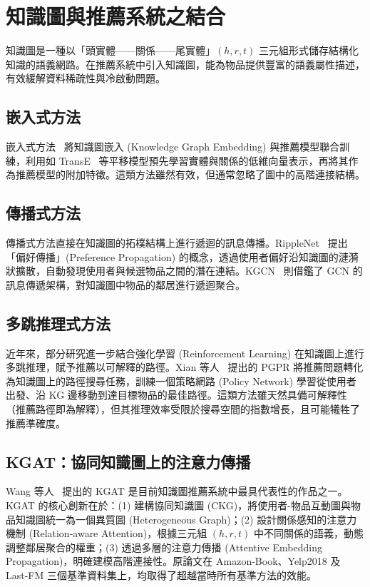 \section{知識圖與推薦系統之結合}

知識圖是一種以「頭實體——關係——尾實體」$(h, r, t)$ 三元組形式儲存結構化知識的語義網路。在推薦系統中引入知識圖，能為物品提供豐富的語義屬性描述，有效緩解資料稀疏性與冷啟動問題。

\subsection*{嵌入式方法}

嵌入式方法~\cite{wang2019cke} 將知識圖嵌入 (Knowledge Graph Embedding) 與推薦模型聯合訓練，利用如 TransE~\cite{bordes2013transe} 等平移模型預先學習實體與關係的低維向量表示，再將其作為推薦模型的附加特徵。這類方法雖然有效，但通常忽略了圖中的高階連接結構。

\subsection*{傳播式方法}

傳播式方法直接在知識圖的拓樸結構上進行遞迴的訊息傳播。RippleNet~\cite{wang2018ripplenet} 提出「偏好傳播」(Preference Propagation) 的概念，透過使用者偏好沿知識圖的漣漪狀擴散，自動發現使用者與候選物品之間的潛在連結。KGCN~\cite{wang2019kgcn} 則借鑑了 GCN 的訊息傳遞架構，對知識圖中物品的鄰居進行遞迴聚合。

\subsection*{多跳推理式方法}

近年來，部分研究進一步結合強化學習 (Reinforcement Learning) 在知識圖上進行多跳推理，賦予推薦以可解釋的路徑。Xian 等人~\cite{xian2019kgpolicy} 提出的 PGPR 將推薦問題轉化為知識圖上的路徑搜尋任務，訓練一個策略網路 (Policy Network) 學習從使用者出發、沿 KG 邊移動到達目標物品的最佳路徑。這類方法雖天然具備可解釋性（推薦路徑即為解釋），但其推理效率受限於搜尋空間的指數增長，且可能犧牲了推薦準確度。

\subsection*{KGAT：協同知識圖上的注意力傳播}

Wang 等人~\cite{wang2019kgat} 提出的 KGAT 是目前知識圖推薦系統中最具代表性的作品之一。KGAT 的核心創新在於：(1) 建構協同知識圖 (CKG)，將使用者-物品互動圖與物品知識圖統一為一個異質圖 (Heterogeneous Graph)；(2) 設計關係感知的注意力機制 (Relation-aware Attention)，根據三元組 $(h, r, t)$ 中不同關係的語義，動態調整鄰居聚合的權重；(3) 透過多層的注意力傳播 (Attentive Embedding Propagation)，明確建模高階連接性。原論文在 Amazon-Book、Yelp2018 及 Last-FM 三個基準資料集上，均取得了超越當時所有基準方法的效能。


